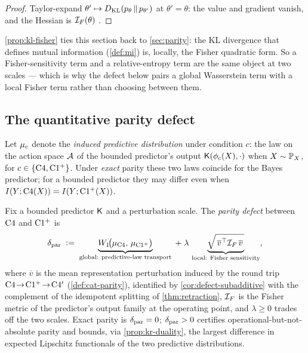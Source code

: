 \begin{proof}
Taylor-expand $\theta'\mapsto D_{\mathrm{KL}}\!\left(p_\theta \,\Vert\, p_{\theta'}\right)$ at $\theta'=\theta$:
the value and gradient vanish, and the Hessian is $\mathcal{I}_{F}(\theta)$
\citep[Ch.~3]{amarinagaoka2000}.
\end{proof}

\cref{prop:kl-fisher} ties this section back to \cref{sec:parity}: the KL
divergence that defines mutual information (\cref{def:mi}) is, locally, the
Fisher quadratic form. So a Fisher-sensitivity term and a relative-entropy
term are the same object at two scales --- which is why the defect below pairs
a global Wasserstein term with a local Fisher term rather than choosing
between them.

\subsection{The quantitative parity defect}
\label{subsec:defect-def}

Let $\mu_{c}$ denote the \emph{induced predictive distribution} under
condition $c$: the law on the action space $\mathcal{A}$ of the bounded
predictor's output $\mathsf{K}(\phi_c(X),\cdot)$ when $X\sim\mathbb{P}_X$, for
$c\in\{\mathrm{C}4,\mathrm{C1^{+}}\}$. Under \emph{exact} parity these two laws
coincide for the Bayes predictor; for a bounded predictor they may differ even
when $I(Y ; \mathrm{C}4(X))=I(Y ; \mathrm{C1^{+}}(X))$.

\begin{definition}
\label{def:parity-defect}
Fix a bounded predictor $\mathsf{K}$ and a perturbation scale. The
\emph{parity defect} between $\mathrm{C}4$ and $\mathrm{C1^{+}}$ is
\begin{equation}
  \label{eq:parity-defect}
  \delta_{\mathrm{par}}
  \;\vcentcolon=\;
  \underbrace{W_{1}\!\big(\mu_{\mathrm{C}4},\,\mu_{\mathrm{C1^{+}}}\big)}_{\text{global: predictive-law transport}}
  \;+\;
  \lambda\,
  \underbrace{\sqrt{\,\overline{v}^\top \mathcal{I}_{F}\, \overline{v}\,}}_{\text{local: Fisher sensitivity}},
\end{equation}
where $\overline{v}$ is the mean representation perturbation induced by the
round trip $\mathrm{C}4 \!\to\! \mathrm{C1^{+}} \!\to\! \mathrm{C}4'$ (\cref{def:cat-parity}),
identified by \cref{cor:defect-subadditive} with the complement of the
idempotent splitting of \cref{thm:retraction},
$\mathcal{I}_{F}$ is the Fisher metric of the predictor's output family at the
operating point, and $\lambda\ge0$ trades off the two scales. Exact parity is
$\delta_{\mathrm{par}}=0$; $\delta_{\mathrm{par}}>0$ certifies operational-but-not-absolute
parity and bounds, via \cref{prop:kr-duality}, the largest difference in
expected Lipschitz functionals of the two predictive distributions.
\end{definition}

